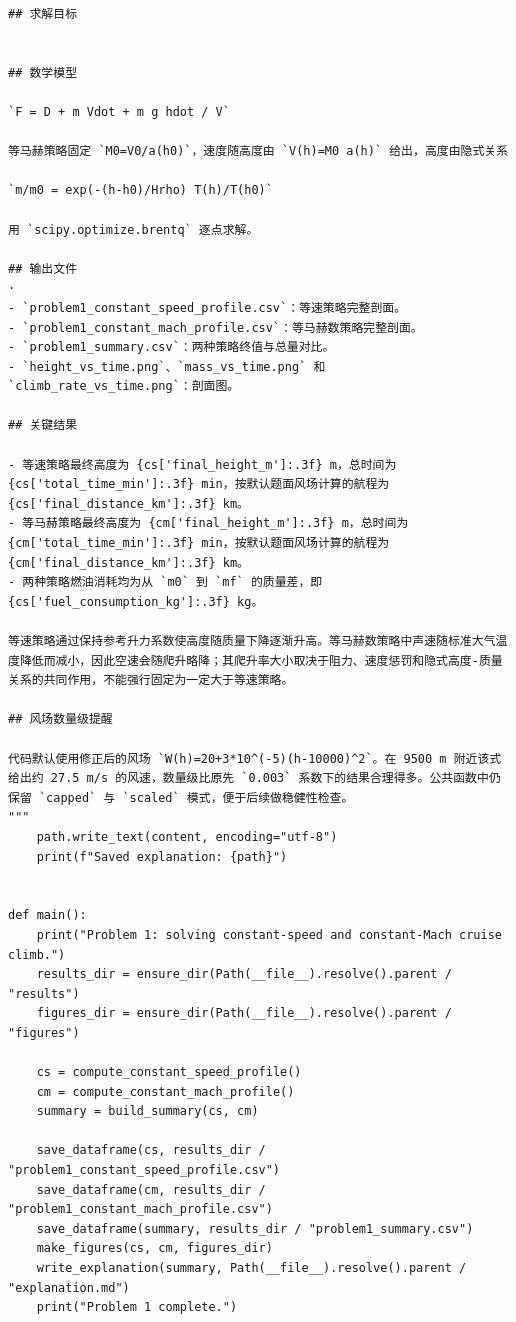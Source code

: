 \documentclass[withoutpreface,bwprint]{cumcmthesis} %
\begin{document}
\begin{center}
\begin{lstlisting}
## 求解目标


## 数学模型

`F = D + m Vdot + m g hdot / V`

等马赫策略固定 `M0=V0/a(h0)`，速度随高度由 `V(h)=M0 a(h)` 给出，高度由隐式关系

`m/m0 = exp(-(h-h0)/Hrho) T(h)/T(h0)`

用 `scipy.optimize.brentq` 逐点求解。

## 输出文件
·
- `problem1_constant_speed_profile.csv`：等速策略完整剖面。
- `problem1_constant_mach_profile.csv`：等马赫数策略完整剖面。
- `problem1_summary.csv`：两种策略终值与总量对比。
- `height_vs_time.png`、`mass_vs_time.png` 和 `climb_rate_vs_time.png`：剖面图。

## 关键结果

- 等速策略最终高度为 {cs['final_height_m']:.3f} m，总时间为 {cs['total_time_min']:.3f} min，按默认题面风场计算的航程为 {cs['final_distance_km']:.3f} km。
- 等马赫策略最终高度为 {cm['final_height_m']:.3f} m，总时间为 {cm['total_time_min']:.3f} min，按默认题面风场计算的航程为 {cm['final_distance_km']:.3f} km。
- 两种策略燃油消耗均为从 `m0` 到 `mf` 的质量差，即 {cs['fuel_consumption_kg']:.3f} kg。

等速策略通过保持参考升力系数使高度随质量下降逐渐升高。等马赫数策略中声速随标准大气温度降低而减小，因此空速会随爬升略降；其爬升率大小取决于阻力、速度惩罚和隐式高度-质量关系的共同作用，不能强行固定为一定大于等速策略。

## 风场数量级提醒

代码默认使用修正后的风场 `W(h)=20+3*10^(-5)(h-10000)^2`。在 9500 m 附近该式给出约 27.5 m/s 的风速，数量级比原先 `0.003` 系数下的结果合理得多。公共函数中仍保留 `capped` 与 `scaled` 模式，便于后续做稳健性检查。
"""
    path.write_text(content, encoding="utf-8")
    print(f"Saved explanation: {path}")


def main():
    print("Problem 1: solving constant-speed and constant-Mach cruise climb.")
    results_dir = ensure_dir(Path(__file__).resolve().parent / "results")
    figures_dir = ensure_dir(Path(__file__).resolve().parent / "figures")

    cs = compute_constant_speed_profile()
    cm = compute_constant_mach_profile()
    summary = build_summary(cs, cm)

    save_dataframe(cs, results_dir / "problem1_constant_speed_profile.csv")
    save_dataframe(cm, results_dir / "problem1_constant_mach_profile.csv")
    save_dataframe(summary, results_dir / "problem1_summary.csv")
    make_figures(cs, cm, figures_dir)
    write_explanation(summary, Path(__file__).resolve().parent / "explanation.md")
    print("Problem 1 complete.")



\end{lstlisting}
\end{center}
\end{document}
